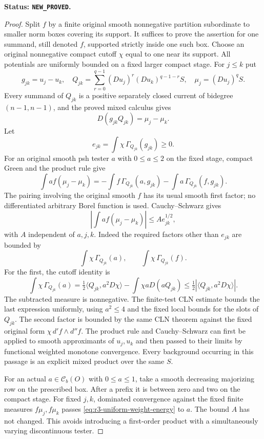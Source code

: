 \documentclass[11pt,a4paper]{article}
\numberwithin{equation}{section}
\theoremstyle{definition}
\theoremstyle{remark}
\begin{document}
\noindent\textbf{Status: \texttt{NEW\_PROVED}.}

\begin{proof}
Split $f$ by a finite original smooth nonnegative partition subordinate
to smaller norm boxes covering its support.  It suffices to prove
the assertion for one summand, still denoted $f$, supported strictly
inside one such box.  Choose an original nonnegative compact cutoff
$\chi$ equal to one near its support.  All potentials are uniformly
bounded on a fixed larger compact stage.  For $j\leq k$ put
\[
 g_{jk}=u_j-u_k,\quad
 Q_{jk}=\sum_{r=0}^{q-1}(Du_j)^r(Du_k)^{q-1-r}S,\quad
 \mu_j=(Du_j)^qS.
\]
Every summand of $Q_{jk}$ is a positive separately closed current
of bidegree $(n-1,n-1)$, and the proved mixed calculus gives
\[
 D(g_{jk}Q_{jk})=\mu_j-\mu_k.
\]
Let
\[
 e_{jk}=\int\chi\,\Gamma_{Q_{jk}}(g_{jk})\geq0.
\]
For an original smooth psh tester $a$ with $0\leq a\leq2$ on
the fixed stage, compact Green and the product rule give
\[
 \int af(\mu_j-\mu_k)
   =-\int f\,\Gamma_{Q_{jk}}(a,g_{jk})
     -\int a\,\Gamma_{Q_{jk}}(f,g_{jk}).
\]
The pairing involving the original smooth $f$ has its usual smooth
first factor; no differentiated arbitrary Borel function is used.
Cauchy--Schwarz gives
\begin{equation}
 \left|\int af(\mu_j-\mu_k)\right|\leq A e_{jk}^{1/2},
 \label{eq:r3-uniform-weight-energy}
\end{equation}
with $A$ independent of $a,j,k$.  Indeed the required factors other
than $e_{jk}$ are bounded by
\[
 \int\chi\,\Gamma_{Q_{jk}}(a),\qquad
 \int\chi\,\Gamma_{Q_{jk}}(f).
\]
For the first, the cutoff identity is
\[
 \int\chi\,\Gamma_{Q_{jk}}(a)
 =\tfrac12\langle Q_{jk},a^2D\chi\rangle
       -\int\chi aD(aQ_{jk})
 \leq\tfrac12\left|\langle Q_{jk},a^2D\chi\rangle\right|.
\]
The subtracted measure is nonnegative.  The finite-test CLN estimate
bounds the last expression uniformly, using $a^2\leq4$ and the
fixed local bounds for the slots of $Q_{jk}$.  The second factor
is bounded by the same CLN theorem against the fixed original form
$\chi\,d'f\wedge d''f$.  The product rule and Cauchy--Schwarz can
first be applied to smooth approximants of $u_j,u_k$ and then passed
to their limits by functional weighted monotone convergence.  Every
background occurring in this passage is an explicit mixed product
over the same $S$.

For an actual $a\in\mathcal C_b(O)$ with $0\leq a\leq1$, take a
smooth decreasing majorizing row on the prescribed box.  After a
prefix it is between zero and two on the compact stage.  For fixed
$j,k$, dominated convergence against the fixed finite measures
$f\mu_j,f\mu_k$ passes \eqref{eq:r3-uniform-weight-energy} to $a$.
The bound $A$ has not changed.  This avoids introducing a first-order
product with a simultaneously varying discontinuous tester.


\end{proof}
\end{document}
